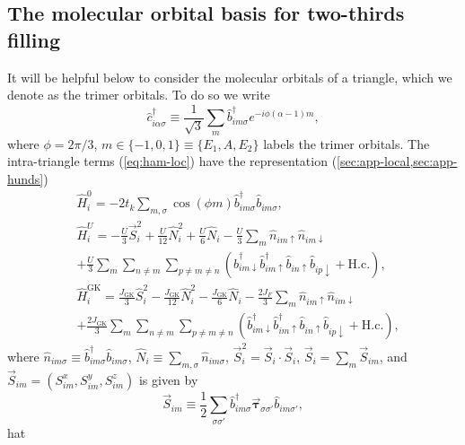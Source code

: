 \documentclass[reprint,aps,prb,amsmath,amssymb]{revtex4-2}
\begin{document}
\subsection{The molecular orbital basis for two-thirds filling}

It will be helpful below to consider the molecular orbitals of a triangle, which we denote as the trimer orbitals. To do so we write
%
\begin{equation}
\hat{c}_{i\alpha\sigma}^{\dagger} \equiv \frac{1}{\sqrt{3}} \sum_m \hat{b}_{im\sigma}^{\dagger} e^{-i \phi(\alpha - 1)m},
\end{equation}
%
where $\phi = 2\pi/3$, $m \in \{ -1,0,1 \} \equiv \{E_1, A, E_2\}$ labels the trimer orbitals. The intra-triangle terms (\cref{eq:ham-loc}) have the representation (\cref{sec:app-local,sec:app-hunds})
%
\begin{align} 
\label{eq-ham-0-trimer}
& \hat{H}_i^{0} = -2t_k \sum_{m,\sigma} \cos(\phi m) \hat{b}_{im\sigma}^{\dagger} \hat{b}_{im\sigma}^{}, \\
%
\label{eq-ham-U-trimer}
& \hat{H}_i^U = - \frac{U}{3} \vec{S}_i^2 + \frac{U}{12} \hat{N}_i^2 + \frac{U}{6} \hat{N}_i - \frac{U}{3} \sum_m \hat{n}_{im\uparrow} \hat{n}_{im\downarrow} \nonumber \\
%
& + \frac{U}{3} \sum_{m} \sum_{n \neq m} \sum_{p \neq m \neq n} \left( \hat{b}_{im \downarrow}^{\dagger} \hat{b}_{im \uparrow}^{\dagger} \hat{b}_{in \uparrow}^{} \hat{b}_{ip \downarrow}^{} + \mathrm{H.c.} \right), \\
%
\label{eq-ham-F-trimer}
& \hat{H}_i^{\mathrm{GK}} = \frac{J_{\mathrm{GK}}}{3} \hat{S}_i^2 - \frac{J_{\mathrm{GK}}}{12} \hat{N}_i^2 - \frac{J_{\mathrm{GK}}}{6} \hat{N}_i - \frac{2 J_F}{3} \sum_{m} \hat{n}_{im\uparrow} \hat{n}_{im\downarrow} \nonumber \\
%
& + \frac{2 J_{\mathrm{GK}}}{3} \sum_{m} \sum_{n \neq m} \sum_{p \neq m \neq n} \left( \hat{b}_{im \downarrow}^{\dagger} \hat{b}_{im \uparrow}^{\dagger} \hat{b}_{in \uparrow}^{} \hat{b}_{ip \downarrow}^{} + \mathrm{H.c.} \right),
\end{align}
%
where $\hat{n}_{im \sigma} \equiv \hat{b}_{im\sigma}^{\dagger} \hat{b}_{im\sigma}^{}$, $\hat{N}_i \equiv \sum_{m,\sigma} \hat{n}_{i m \sigma}$, $\vec{S}_i^2 = \vec{S}_i \cdot \vec{S}_i$, $\vec{S}_i = \sum_m \vec{S}_{im}$, and $\vec{S}_{im} = (S_{im}^x, S_{im}^y, S_{im}^z)$ is given by
%
\begin{equation}
\vec{S}_{im} \equiv \frac{1}{2} \sum_{\sigma \sigma'} \hat{b}_{im \sigma}^{\dagger} \vec{\bm{\tau}}_{\sigma \sigma'} \hat{b}_{im \sigma'}^{},
\end{equation}hat
\end{document}
